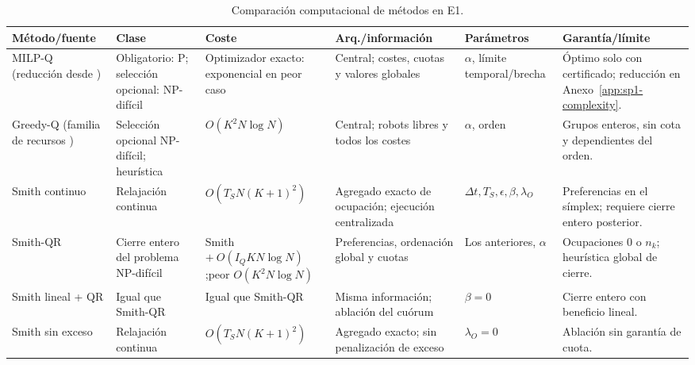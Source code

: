 \begin{table}[!htbp]
 \centering
  \caption{Comparación computacional de métodos en E1.}
 \label{tab:sp1-methods}
  \viutablefont
  \setlength{\tabcolsep}{1.3pt}
  \renewcommand{\arraystretch}{0.92}
  \begin{tabularx}{\textwidth}{>{\raggedright\arraybackslash}p{2.2cm} >{\raggedright\arraybackslash}p{1.6cm} >{\raggedright\arraybackslash}p{2.35cm} >{\raggedright\arraybackslash}p{2.0cm} >{\raggedright\arraybackslash}p{1.75cm} Y}
  \toprule
  Método/fuente & Clase & Coste & Arq./información & Parámetros & Garantía/límite \\
  \midrule
  MILP-Q (reducción desde \textcite{karp1972reducibility}) & Obligatorio: P; selección opcional: NP-difícil & Optimizador exacto: exponencial en peor caso & Central; costes, cuotas y valores globales & $\alpha$, límite temporal/brecha & Óptimo solo con certificado; reducción en Anexo~\ref{app:sp1-complexity}. \\
  Greedy-Q (familia de recursos \parencite{zhangParker2013Resources}) & Selección opcional NP-difícil; heurística & $O(K^2N\log N)$ & Central; robots libres y todos los costes & $\alpha$, orden & Grupos enteros, sin cota y dependientes del orden. \\
  Smith continuo \parencite{sandholm2010population} & Relajación continua & $O(T_SN(K+1)^2)$ & Agregado exacto de ocupación; ejecución centralizada & $\Delta t,\allowbreak T_S,\allowbreak\epsilon,\allowbreak\beta,\allowbreak\lambda_O$ & Preferencias en el símplex; requiere cierre entero posterior. \\
  Smith-QR & Cierre entero del problema NP-difícil & Smith $+\ {\scriptscriptstyle O(I_QKN\log N)}$;\allowbreak peor $O(K^2N\log N)$ & Preferencias, ordenación global y cuotas & Los anteriores, $\alpha$ & Ocupaciones \(0\) o \(n_k\); heurística global de cierre. \\
  Smith lineal + QR & Igual que Smith-QR & Igual que Smith-QR & Misma información; ablación del cuórum & $\beta=0$ & Cierre entero con beneficio lineal. \\
  Smith sin exceso & Relajación continua & $O(T_SN(K+1)^2)$ & Agregado exacto; sin penalización de exceso & $\lambda_O=0$ & Ablación sin garantía de cuota. \\
  \bottomrule
 \end{tabularx}
\end{table}

